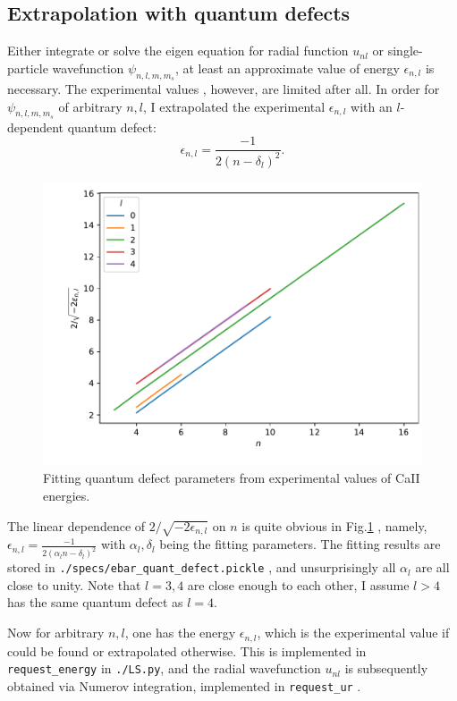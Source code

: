 \documentclass{article}
\begin{document}
\subsection{Extrapolation with quantum defects}
Either integrate or solve the eigen equation for radial function $u_{nl}$ or single-particle wavefunction $\psi_{n,l,m,m_s}$, at least an approximate value of energy $\epsilon_{n,l}$ is necessary. The experimental values \cite{SC85}, however, are limited after all. In order for $\psi_{n,l,m,m_s}$ of arbitrary $n,l$, I extrapolated the experimental $\epsilon_{n,l}$ with an $l$-dependent quantum defect:
\begin{equation}
\epsilon_{n,l} = \frac{-1}{2(n-\delta_l)^2} .
\end{equation}
\begin{figure}
\centering
\includegraphics[width=0.7\linewidth]{../Dev/QD.pdf}
\caption{Fitting quantum defect parameters from experimental values of CaII energies.}\label{fig:QD}
\end{figure}
The linear dependence of $2/\sqrt{-2\epsilon_{n,l}}$ on $n$ is quite obvious in Fig.\ref{fig:QD} , namely, $\epsilon_{n,l} = \frac{-1}{2(\alpha_ln-\delta_l)^2}$ with $\alpha_l, \delta_l$ being the fitting parameters.
The fitting results are stored in \texttt{./specs/ebar_quant_defect.pickle} , and unsurprisingly all $\alpha_l$ are all close to unity.  Note that $l=3,4$ are close enough to each other, I assume $l>4$ has the same quantum defect as $l=4$.

Now for arbitrary $n,l$, one has the energy $\epsilon_{n,l}$, which is the experimental value if could be found or extrapolated otherwise. This is implemented in \texttt{request_energy} in \texttt{./LS.py}, and the radial wavefunction $u_{nl}$ is subsequently obtained via Numerov integration, implemented in \texttt{request_ur} .
\end{document}
